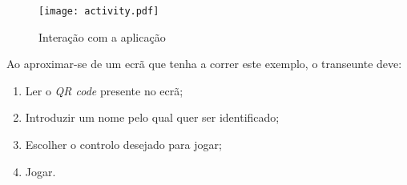 	\begin{figure}[ht]
	\centering
	\texttt{[image: activity.pdf]}
	\caption[Utilização]{Interação com a aplicação}
	\label{fig:interagir}
	\end{figure}

	Ao aproximar-se de um ecrã que tenha a correr este exemplo, o transeunte deve:

	\begin{enumerate}
		\item Ler o \textit{QR code} presente no ecrã;
		\item Introduzir um nome pelo qual quer ser identificado;
		\item Escolher o controlo desejado para jogar;
		\item Jogar.
	\end{enumerate}


	


	






